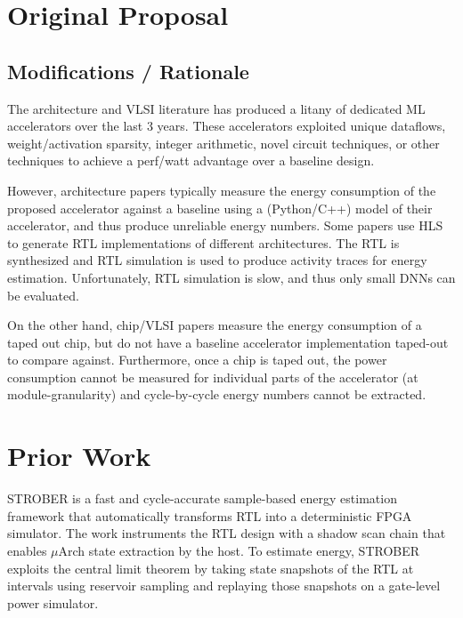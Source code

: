 \documentclass[sigconf]{acmart}
\begin{document}
\section{Original Proposal}

\subsection{Modifications / Rationale}


The architecture and VLSI literature has produced a litany of dedicated ML accelerators over the last 3 years.
These accelerators exploited unique dataflows, weight/activation sparsity, integer arithmetic, novel circuit techniques, or other techniques to achieve a perf/watt advantage over a baseline design.

However, architecture papers typically measure the energy consumption of the proposed accelerator against a baseline using a (Python/C++) model of their accelerator, and thus produce unreliable energy numbers.
Some papers use HLS to generate RTL implementations of different architectures.
The RTL is synthesized and RTL simulation is used to produce activity traces for energy estimation.
Unfortunately, RTL simulation is slow, and thus only small DNNs can be evaluated.

On the other hand, chip/VLSI papers measure the energy consumption of a taped out chip, but do not have a baseline accelerator implementation taped-out to compare against.
Furthermore, once a chip is taped out, the power consumption cannot be measured for individual parts of the accelerator (at module-granularity) and cycle-by-cycle energy numbers cannot be extracted.

\section{Prior Work}
STROBER\cite{strober} is a fast and cycle-accurate sample-based energy estimation framework that automatically transforms RTL into a deterministic FPGA simulator.
The work instruments the RTL design with a shadow scan chain that enables $\mu$Arch state extraction by the host.
To estimate energy, STROBER exploits the central limit theorem by taking state snapshots of the RTL at intervals using reservoir sampling and replaying those snapshots on a gate-level power simulator.
\end{document}

